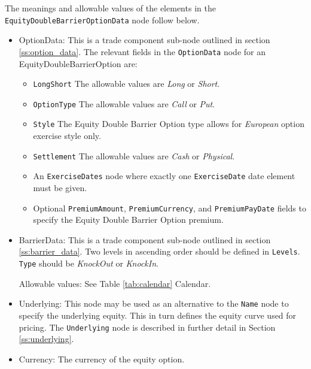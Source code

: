 The meanings and allowable values of the elements in the
\lstinline!EquityDoubleBarrierOptionData! node follow below.

\begin{itemize}


\item OptionData: This is a trade component sub-node outlined in section \ref{ss:option_data}. 
The relevant fields in the \lstinline!OptionData! node for an EquityDoubleBarrierOption are:

\begin{itemize}
\item \lstinline!LongShort! The allowable values are \emph{Long} or \emph{Short}.

\item \lstinline!OptionType! The allowable values are \emph{Call} or \emph{Put}.

\item  \lstinline!Style! The Equity Double Barrier Option type allows for \emph{European}
option exercise style only.

\item  \lstinline!Settlement! The allowable values are \emph{Cash} or \emph{Physical}.

\item An \lstinline!ExerciseDates! node where exactly one \lstinline!ExerciseDate! date
element must be given.

\item Optional \lstinline!PremiumAmount!,  \lstinline!PremiumCurrency!, and
\lstinline!PremiumPayDate! fields to specify the Equity Double Barrier Option premium. 

\end{itemize}

\item BarrierData: This is a trade component sub-node outlined in section
\ref{ss:barrier_data}. Two levels in ascending order should be defined in \lstinline!Levels!.
\lstinline!Type! should be \emph{KnockOut} or \emph{KnockIn}.

Allowable values: See Table \ref{tab:calendar} Calendar.

\item Underlying:  This node may be used as an alternative to the \lstinline!Name! node to specify the underlying equity. This in turn defines the equity curve used for pricing. The \lstinline!Underlying! node is described in further detail in Section \ref{ss:underlying}.

\item Currency: The currency of the equity option.


\end{itemize}
